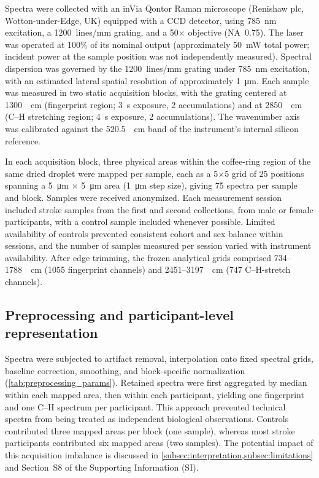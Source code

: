 \documentclass[preprint,12pt]{elsarticle}
\begin{document}
Spectra were collected with an inVia Qontor Raman microscope (Renishaw plc, Wotton-under-Edge, UK) equipped with a CCD detector, using 785~nm excitation, a 1200~lines/mm grating, and a 50$\times$ objective (NA~0.75). The laser was operated at 100\% of its nominal output (approximately 50~mW total power; incident power at the sample position was not independently measured). Spectral dispersion was governed by the 1200~lines/mm grating under 785~nm excitation, with an estimated lateral spatial resolution of approximately 1~\si{\micro\metre}. Each sample was measured in two static acquisition blocks, with the grating centered at 1300~\si{\per\centi\metre} (fingerprint region; 3~s exposure, 2 accumulations) and at 2850~\si{\per\centi\metre} (C--H stretching region; 4~s exposure, 2 accumulations). The wavenumber axis was calibrated against the 520.5~\si{\per\centi\metre} band of the instrument's internal silicon reference.

In each acquisition block, three physical areas within the coffee-ring region of the same dried droplet were mapped per sample, each as a 5$\times$5 grid of 25 positions spanning a 5~\si{\micro\metre} $\times$ 5~\si{\micro\metre} area (1~\si{\micro\metre} step size), giving 75 spectra per sample and block. Samples were received anonymized. Each measurement session included stroke samples from the first and second collections, from male or female participants, with a control sample included whenever possible. Limited availability of controls prevented consistent cohort and sex balance within sessions, and the number of samples measured per session varied with instrument availability.
After edge trimming, the frozen analytical grids comprised 734--1788~\si{\per\centi\metre} (1055 fingerprint channels) and 2451--3197~\si{\per\centi\metre} (747 C--H-stretch channels).

\subsection{Preprocessing and participant-level representation} \label{subsec:preprocessing}

Spectra were subjected to artifact removal, interpolation onto fixed spectral grids, baseline correction, smoothing, and block-specific normalization (\cref{tab:preprocessing_params}). Retained spectra were first aggregated by median within each mapped area, then within each participant, yielding one fingerprint and one C--H spectrum per participant. This approach prevented technical spectra from being treated as independent biological observations. Controls contributed three mapped areas per block (one sample), whereas most stroke participants contributed six mapped areas (two samples). The potential impact of this acquisition imbalance is discussed in \cref{subsec:interpretation,subsec:limitations} and Section~S8 of the Supporting Information (SI).
\end{document}
